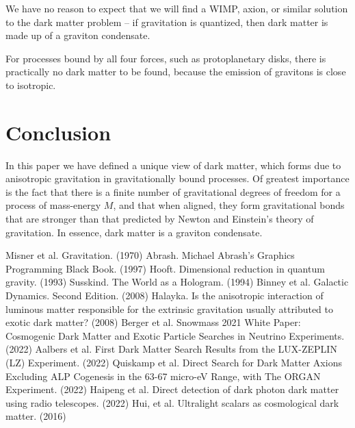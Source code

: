 \documentclass[12pt]{article}
\begin{document}
We have no reason to expect that we will find a WIMP, axion, or similar solution \cite{berger, aalbers, quiskamp, haipeng, hui} to the dark matter problem -- if gravitation is quantized, then dark matter is made up of a graviton condensate.

For processes bound by all four forces, such as protoplanetary disks, there is practically no dark matter to be found, because the emission of gravitons is close to isotropic.




\section{Conclusion}

In this paper we have defined a unique view of dark matter, which forms due to anisotropic gravitation in gravitationally bound processes.
Of greatest importance is the fact that there is a finite number of gravitational degrees of freedom for a process of mass-energy $M$, and that when aligned, they form gravitational bonds that are stronger than that predicted by Newton and Einstein's theory of gravitation.
In essence, dark matter is a graviton condensate.


\pagebreak




\begin{thebibliography}{9}
 Misner et al. Gravitation. (1970)
 Abrash. Michael Abrash's Graphics Programming Black Book. (1997)
 Hooft. Dimensional reduction in quantum gravity. (1993)
 Susskind. The World as a Hologram. (1994)
 Binney et al. Galactic Dynamics. Second Edition. (2008)
 Halayka. Is the anisotropic interaction of luminous matter responsible for the extrinsic gravitation usually attributed to exotic dark matter? (2008)
 Berger et al. Snowmass 2021 White Paper: Cosmogenic Dark Matter and Exotic Particle Searches in Neutrino Experiments. (2022)
 Aalbers et al. First Dark Matter Search Results from the LUX-ZEPLIN (LZ) Experiment. (2022)
 Quiskamp et al. Direct Search for Dark Matter Axions Excluding ALP Cogenesis in the 63-67 micro-eV Range, with The ORGAN Experiment. (2022)
 Haipeng et al. Direct detection of dark photon dark matter using radio telescopes. (2022)
 Hui, et al. Ultralight scalars as cosmological dark matter. (2016)
\end{thebibliography}
\end{document}
